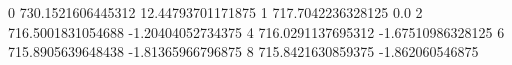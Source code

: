 0 730.1521606445312 12.44793701171875
1 717.7042236328125 0.0
2 716.5001831054688 -1.20404052734375
4 716.0291137695312 -1.67510986328125
6 715.8905639648438 -1.81365966796875
8 715.8421630859375 -1.862060546875
